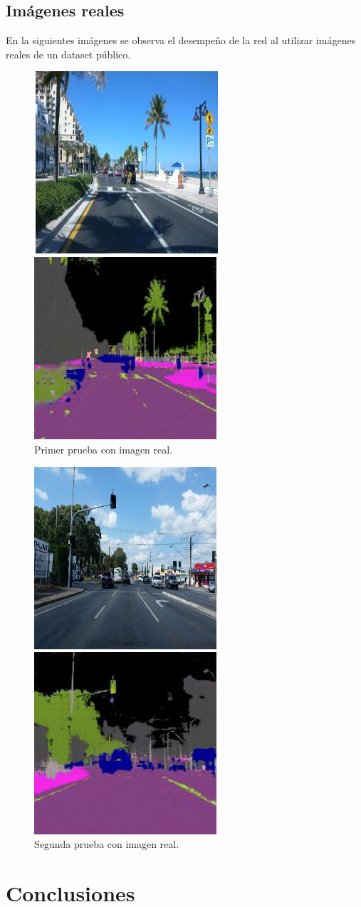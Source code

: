 \documentclass[]{IEEEtran}
\begin{document}
    \subsection{Imágenes reales}
    En la siguientes imágenes se observa el desempeño de la red al utilizar imágenes reales de un dataset público. 
    \begin{figure}[htb]
        \centering
        \includegraphics[width=.25\textwidth]{Imgs/PalmeraRGBSEM.png}    
        \caption{Primer prueba con imagen real.}
        \label{fig:real-results}
    \end{figure}
    \begin{figure}[htb]
        \centering
        \includegraphics[width=.25\textwidth]{Imgs/SemaforoRGBSEM.png}    
        \caption{Segunda prueba con imagen real.}
        \label{fig:real-results2}
    \end{figure}

    \section{Conclusiones}
    
\end{document}

